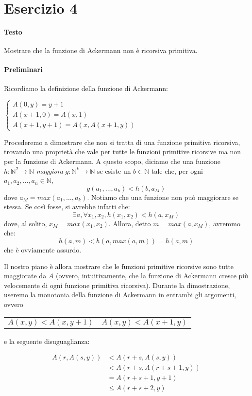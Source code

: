\documentclass[a4paper,10pt]{article}
\begin{document}
\section*{Esercizio 4}
\paragraph{Testo}
Mostrare che la funzione di Ackermann non è ricorsiva primitiva.

\paragraph{Preliminari}
Ricordiamo la definizione della funzione di Ackermann:
\begin{center} $ \begin{cases}
    A(0,y) = y+1 \\
    A(x+1,0) = A(x,1) \\
    A(x+1,y+1) = A(x, A(x+1,y))
\end{cases} $ \end{center}
Procederemo a dimostrare che non si tratta di una funzione primitiva ricorsiva, trovando una proprietà che vale per tutte le funzioni primitive ricorsive ma non per la funzione di Ackermann.
A questo scopo, diciamo che una funzione $h:\mathbb{N}^2 \rightarrow \mathbb{N}$ \emph{maggiora} $g:\mathbb{N}^k \rightarrow \mathbb{N}$ se esiste un $b\in \mathbb{N}$ tale che, per ogni $a_1, a_2, \dots, a_n \in \mathbb{N}$,
$$g(a_1,\dots,a_k) < h(b, a_M)$$
dove $a_M = max(a_1, \dots, a_k)$.
Notiamo che una funzione non può maggiorare se stessa. Se così fosse, si avrebbe infatti che:
$$\exists a, \forall x_1, x_2, h(x_1,x_2)<h(a,x_M)$$
dove, al solito, $x_M = max(x_1,x_2)$. Allora, detto $m=max(a,x_M)$, avremmo che:
$$h(a,m) < h(a,max(a,m)) = h(a,m)$$
che è ovviamente assurdo.

Il nostro piano è allora mostrare che le funzioni primitive ricorsive sono tutte maggiorate da $A$ (ovvero, intuitivamente, che la funzione di Ackermann cresce più velocemente di ogni funzione primitiva ricorsiva).
Durante la dimostrazione, useremo la monotonia della funzione di Ackermann in entrambi gli argomenti, ovvero
\begin{center} \begin{tabular}{p{4cm} p{4cm}}
    $A(x,y)<A(x,y+1)$ & $A(x,y)<A(x+1,y)$
\end{tabular} \end{center}
e la seguente disuguaglianza:

\begin{align*}
  A(r,A(s,y)) &< A(r+s,A(s,y)) \\ &< A(r+s,A(r+s+1,y)) \\ &= A(r+s+1,y+1) \\ &\leq A(r+s+2,y)
\end{align*}
\end{document}
